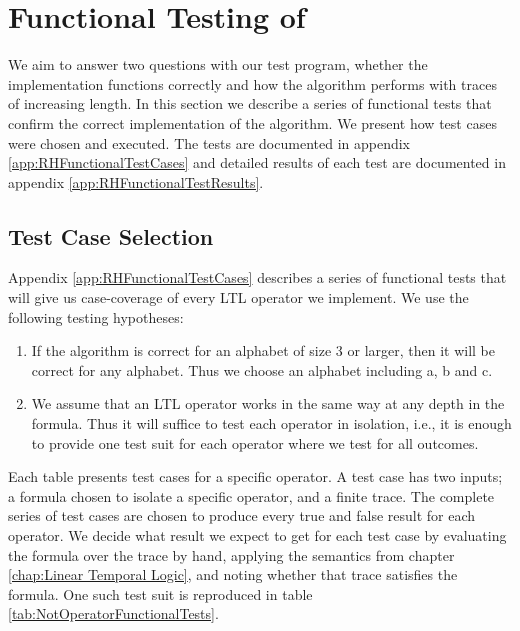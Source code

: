 \section{Functional Testing of \RH}
\label{sec:FunctionalTestingRosuHavelund}

We aim to answer two questions with our test program, whether the implementation functions correctly and how the algorithm performs with traces of increasing length.  In this section we describe a series of functional tests that confirm the correct implementation of the algorithm.  We present how test cases were chosen and executed.  The tests are documented in appendix \ref{app:RHFunctionalTestCases} and detailed results of each test are documented in appendix \ref{app:RHFunctionalTestResults}.

\subsection{Test Case Selection}
\label{subsec:FunctionalTestCaseSelection}

Appendix \ref{app:RHFunctionalTestCases} describes a series of functional tests that will give us case-coverage of every LTL operator we implement.  We use the following testing hypotheses:

\begin{enumerate}
\item If the algorithm is correct for an alphabet of size 3 or larger, then it will be correct for any alphabet.  Thus we choose an alphabet including a, b and c.

\item We assume that an LTL operator works in the same way at any depth in the formula.  Thus it will suffice to test each operator in isolation, i.e., it is enough to provide one test suit for each operator where we test for all outcomes.
\end{enumerate}

Each table presents test cases for a specific operator.  A test case has two inputs; a formula chosen to isolate a specific operator, and a finite trace.  The complete series of test cases are chosen to produce every true and false result for each operator.  We decide what result we expect to get for each test case by evaluating the formula over the trace by hand, applying the semantics from chapter \ref{chap:Linear Temporal Logic}, and noting whether that trace satisfies the formula.  One such test suit is reproduced in table \ref{tab:NotOperatorFunctionalTests}.

